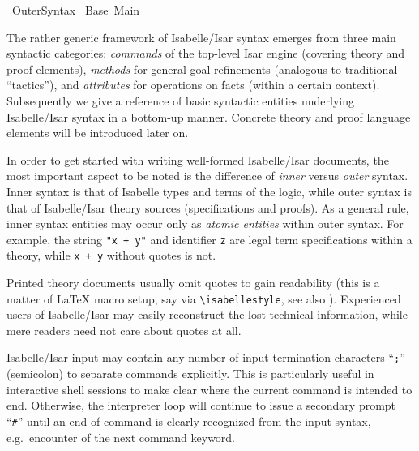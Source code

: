 %
\begin{isabellebody}%
\def\isabellecontext{Outer{\isaliteral{5F}{\isacharunderscore}}Syntax}%
%
\isadelimtheory
%
\endisadelimtheory
%
\isatagtheory
{}\isamarkupfalse%
\ Outer{}Syntax\isanewline
{}\ Base\ Main\isanewline
{}%
\endisatagtheory
{\isafoldtheory}%
%
\isadelimtheory
%
\endisadelimtheory
%
\isamarkuptrue%
%
\begin{isamarkuptext}%
The rather generic framework of Isabelle/Isar syntax emerges from
  three main syntactic categories: \emph{commands} of the top-level
  Isar engine (covering theory and proof elements), \emph{methods} for
  general goal refinements (analogous to traditional ``tactics''), and
  \emph{attributes} for operations on facts (within a certain
  context).  Subsequently we give a reference of basic syntactic
  entities underlying Isabelle/Isar syntax in a bottom-up manner.
  Concrete theory and proof language elements will be introduced later
  on.

  \medskip In order to get started with writing well-formed
  Isabelle/Isar documents, the most important aspect to be noted is
  the difference of \emph{inner} versus \emph{outer} syntax.  Inner
  syntax is that of Isabelle types and terms of the logic, while outer
  syntax is that of Isabelle/Isar theory sources (specifications and
  proofs).  As a general rule, inner syntax entities may occur only as
  \emph{atomic entities} within outer syntax.  For example, the string
  \verb|"x + y"| and identifier \verb|z| are legal term
  specifications within a theory, while \verb|x + y| without
  quotes is not.

  Printed theory documents usually omit quotes to gain readability
  (this is a matter of {\LaTeX} macro setup, say via \verb|\isabellestyle|, see also \cite{isabelle-sys}).  Experienced
  users of Isabelle/Isar may easily reconstruct the lost technical
  information, while mere readers need not care about quotes at all.

  \medskip Isabelle/Isar input may contain any number of input
  termination characters ``\verb|;|'' (semicolon) to separate
  commands explicitly.  This is particularly useful in interactive
  shell sessions to make clear where the current command is intended
  to end.  Otherwise, the interpreter loop will continue to issue a
  secondary prompt ``\verb|#|'' until an end-of-command is
  clearly recognized from the input syntax, e.g.\ encounter of the
  next command keyword.


\end{isamarkuptext}
\end{isabellebody}
